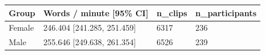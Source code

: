 \begin{tabular}{llll}
\toprule
Group & Words / minute [95\% CI] & n\_clips & n\_participants \\
\midrule
Female & 246.404 [241.285, 251.459] & 6317 & 236 \\
Male & 255.646 [249.638, 261.354] & 6526 & 239 \\
\bottomrule
\end{tabular}
